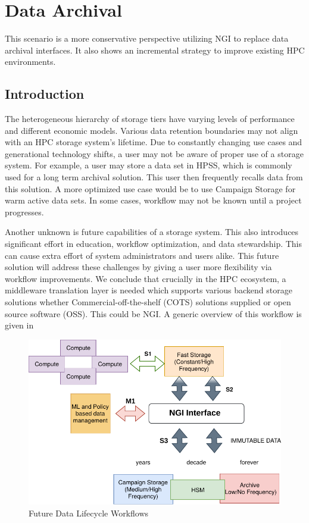 \documentclass[a4paper, twocolumn]{article}
\begin{document}
\section{Data Archival}
This scenario is a more conservative perspective utilizing NGI to replace data archival interfaces.
It also shows an incremental strategy to improve existing HPC environments.

\subsection{Introduction}
The heterogeneous hierarchy of storage tiers have varying levels of performance and different economic models.
Various data retention boundaries may not align with an HPC storage system’s lifetime. Due to constantly changing use cases and generational technology shifts, a user may not be aware of proper use of a storage system.
For example, a user may store a data set in HPSS, which is commonly used for a long term archival solution.
This user then frequently recalls data from this solution.
A more optimized use case would be to use Campaign Storage for warm active data sets.
In some cases, workflow may not be known until a project progresses.

Another unknown is future capabilities of a storage system.
This also introduces significant effort in education, workflow optimization, and data stewardship.
This can cause extra effort of system administrators and users alike.
This future solution will address these challenges by giving a user more flexibility via workflow improvements.
We conclude that crucially in the HPC ecosystem, a middleware translation layer is needed which supports various backend storage solutions whether Commercial-off-the-shelf (COTS) solutions supplied or open source software (OSS).
This could be NGI.
A generic overview of this workflow is given in 

\begin{figure}[b]
  \includegraphics[width=0.75\columnwidth]{datalifecycle-workflow}
  \caption{Future Data Lifecycle Workflows}
  \label{fig:dataLifecycle}
\end{figure}
\end{document}
